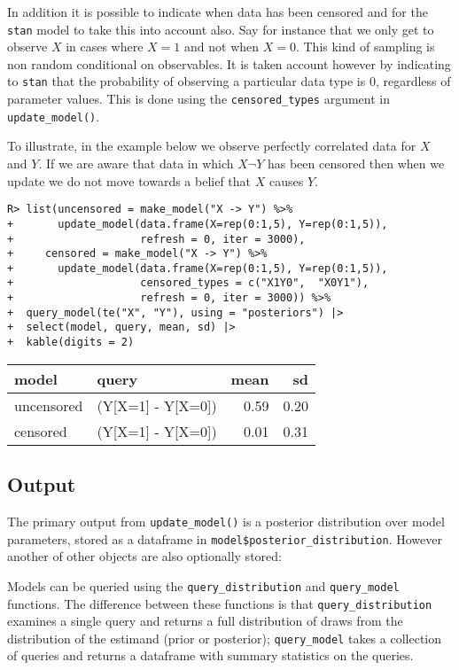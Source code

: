 \documentclass[
  11pt,
  article]{jss}
\begin{document}
In addition it is possible to indicate when data has been censored and
for the \texttt{stan} model to take this into account also. Say for
instance that we only get to observe \(X\) in cases where \(X=1\) and
not when \(X=0\). This kind of sampling is non random conditional on
observables. It is taken account however by indicating to \texttt{stan}
that the probability of observing a particular data type is 0,
regardless of parameter values. This is done using the
\texttt{censored\_types} argument in \texttt{update\_model()}.

To illustrate, in the example below we observe perfectly correlated data
for \(X\) and \(Y\). If we are aware that data in which \(X \neg Y\) has
been censored then when we update we do not move towards a belief that
\(X\) causes \(Y\).

\begin{verbatim}
R> list(uncensored = make_model("X -> Y") %>%
+       update_model(data.frame(X=rep(0:1,5), Y=rep(0:1,5)),
+                    refresh = 0, iter = 3000),
+     censored = make_model("X -> Y") %>%
+       update_model(data.frame(X=rep(0:1,5), Y=rep(0:1,5)),
+                    censored_types = c("X1Y0",  "X0Y1"),
+                    refresh = 0, iter = 3000)) %>%
+  query_model(te("X", "Y"), using = "posteriors") |>
+  select(model, query, mean, sd) |>
+  kable(digits = 2)
\end{verbatim}

\begin{tabular}{l|l|r|r}
\hline
model & query & mean & sd\\
\hline
uncensored & (Y[X=1] - Y[X=0]) & 0.59 & 0.20\\
\hline
censored & (Y[X=1] - Y[X=0]) & 0.01 & 0.31\\
\hline
\end{tabular}

\hypertarget{output}{%
\subsection{Output}\label{output}}

The primary output from \texttt{update\_model()} is a posterior
distribution over model parameters, stored as a dataframe in
\texttt{model\$posterior\_distribution}. However another of other
objects are also optionally stored:

Models can be queried using the \texttt{query\_distribution} and
\texttt{query\_model} functions. The difference between these functions
is that \texttt{query\_distribution} examines a single query and returns
a full distribution of draws from the distribution of the estimand
(prior or posterior); \texttt{query\_model} takes a collection of
queries and returns a dataframe with summary statistics on the queries.
\end{document}
